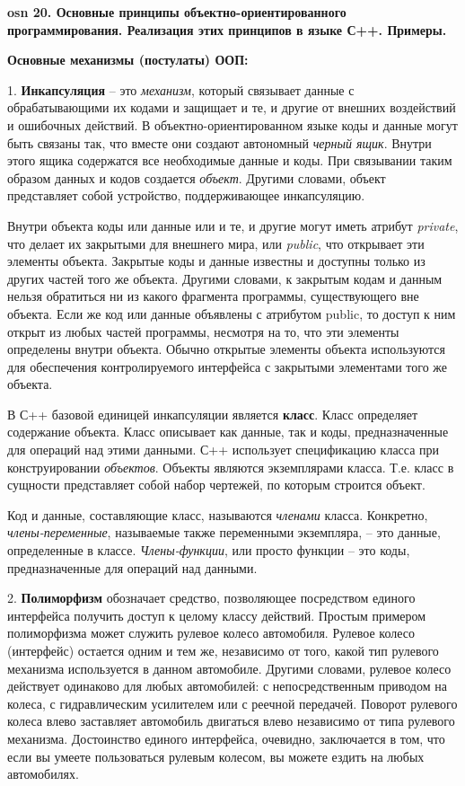 \textbf{\LARGE osn 20. Основные принципы объектно-ориентированного программирования. Реализация этих принципов в языке С++. Примеры.}


\centerline{\textbf{Основные механизмы (постулаты) ООП:}}

1. \textbf{Инкапсуляция} -- это \textit{механизм}, который связывает данные с обрабатывающими их кодами и защищает и те, и другие от внешних воздействий и ошибочных действий. В объектно-ориентированном языке коды и данные могут быть связаны так, что вместе они создают автономный \textit{черный ящик}. Внутри этого ящика содержатся все необходимые данные и коды. При связывании таким образом данных и кодов создается \textit{объект}. Другими словами, объект представляет собой устройство, поддерживающее инкапсуляцию.
    
Внутри объекта коды или данные или и те, и другие могут иметь атрибут \textit{private}, что делает их закрытыми для внешнего мира, или \textit{public}, что открывает эти элементы объекта. Закрытые коды и данные известны и доступны только из других частей того же объекта. Другими словами, к закрытым кодам и данным нельзя обратиться ни из какого фрагмента программы, существующего вне объекта. Если же код или данные объявлены с атрибутом public, то доступ к ним открыт из любых частей программы, несмотря на то, что эти элементы определены внутри объекта. Обычно открытые элементы объекта используются для обеспечения контролируемого интерфейса с закрытыми элементами того же объекта.
    
В С++ базовой единицей инкапсуляции является \textbf{класс}. Класс определяет содержание объекта. Класс описывает как данные, так и коды, предназначенные для операций над этими данными. С++ использует спецификацию класса при конструировании \textit{объектов}. Объекты являются экземплярами класса. Т.е. класс в сущности представляет собой набор чертежей, по которым строится объект.
    
Код и данные, составляющие класс, называются \textit{членами} класса. Конкретно, \textit{члены-переменные}, называемые также переменными экземпляра, -- это данные, определенные в классе. \textit{Члены-функции}, или просто функции -- это коды, предназначенные для операций над данными.
    
2. \textbf{Полиморфизм} обозначает средство, позволяющее посредством единого интерфейса получить доступ к целому классу действий. Простым примером полиморфизма может служить рулевое колесо автомобиля. Рулевое колесо (интерфейс) остается одним и тем же, независимо от того, какой тип рулевого механизма используется в данном автомобиле. Другими словами, рулевое колесо действует одинаково для любых автомобилей: с непосредственным приводом на колеса, с гидравлическим усилителем или с реечной передачей. Поворот рулевого колеса влево заставляет автомобиль двигаться влево независимо от типа рулевого механизма. Достоинство единого интерфейса, очевидно, заключается в том, что если вы умеете пользоваться рулевым колесом, вы можете ездить на любых автомобилях.
    
